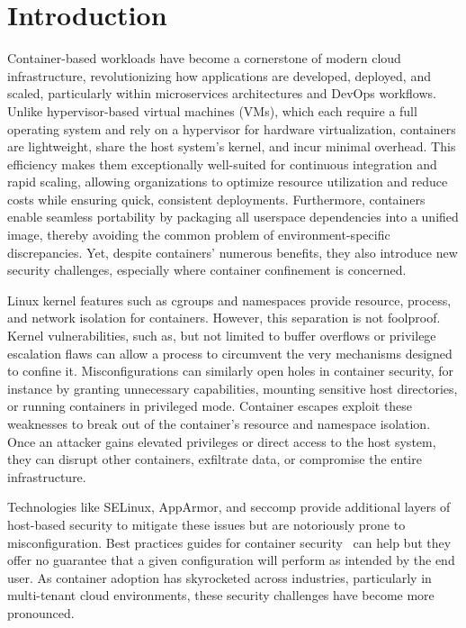 \section{Introduction}

Container-based workloads have become a cornerstone of modern cloud infrastructure, revolutionizing how applications are developed, deployed, and scaled, particularly within microservices architectures and DevOps workflows. Unlike hypervisor-based virtual machines (VMs), which each require a full operating system and rely on a hypervisor for hardware virtualization, containers are lightweight, share the host system’s kernel, and incur minimal overhead. This efficiency makes them exceptionally well-suited for continuous integration and rapid scaling, allowing organizations to optimize resource utilization and reduce costs while ensuring quick, consistent deployments. Furthermore, containers enable seamless portability by packaging all userspace dependencies into a unified image, thereby avoiding the common problem of environment-specific discrepancies. Yet, despite containers’ numerous benefits, they also introduce new security challenges, especially where container confinement is concerned.

Linux kernel features such as cgroups and namespaces provide resource, process, and network isolation for containers. However, this separation is not foolproof. Kernel vulnerabilities, such as, but not limited to buffer overflows or privilege escalation flaws can allow a process to circumvent the very mechanisms designed to confine it. Misconfigurations can similarly open holes in container security, for instance by granting unnecessary capabilities, mounting sensitive host directories, or running containers in privileged mode. Container escapes exploit these weaknesses to break out of the container’s resource and namespace isolation. Once an attacker gains elevated privileges or direct access to the host system, they can disrupt other containers, exfiltrate data, or compromise the entire infrastructure. 

Technologies like SELinux, AppArmor, and seccomp provide additional layers of host-based security to mitigate these issues but are notoriously prone to misconfiguration. Best practices guides for container security~\cite{CIS} can help but they offer no guarantee that a given configuration will perform as intended by the end user. As container adoption has skyrocketed across industries, particularly in multi-tenant cloud environments, these security challenges have become more pronounced.

